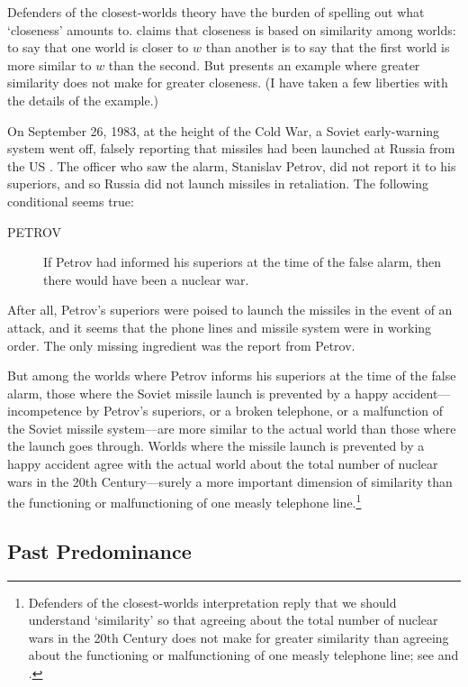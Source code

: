 Defenders of the closest-worlds theory have the burden of spelling out what `closeness' amounts to. \citet{lewis-counterfactuals} claims that closeness is based on similarity among worlds: to say that one world is closer to $w$ than another is to say that the first world is more similar to $w$ than the second.  But \citet{Fine1975-FINCN-2} presents an example where greater similarity does not make for greater closeness.  (I have taken a few liberties with the details of the example.)

On September 26, 1983, at the height of the Cold War, a Soviet early-warning system went off, falsely reporting that missiles had been launched at Russia from the US \citep{petrov}.  The officer who saw the alarm, Stanislav Petrov, did not report it to his superiors, and so Russia did not launch missiles in retaliation. The following conditional seems true:
\begin{description}
\item[PETROV] If Petrov had informed his superiors at the time of the false alarm, then there would have been a nuclear war.
\end{description}
%
After all, Petrov's superiors were poised to launch the missiles in the event of an attack, and it seems that the phone lines and missile system were in working order.  The only missing ingredient was the report from Petrov.

But among the worlds where Petrov informs his superiors at the time of the false alarm, those where the Soviet missile launch is prevented by a happy accident---incompetence by Petrov's superiors, or a broken telephone, or a malfunction of the Soviet missile system---are more similar to the actual world than those where the launch goes through.  Worlds where the missile launch is prevented by a happy accident agree with the actual world about the total number of nuclear wars in the 20th Century---surely a more important dimension of similarity than the functioning or malfunctioning of one measly telephone line.\footnote{Defenders of the closest-worlds interpretation reply that we should understand `similarity' so that agreeing about the total number of nuclear wars in the 20th Century does not make for greater similarity than agreeing about the functioning or malfunctioning of one measly telephone line; see \citet{Lewis1979-LEWCDA} and \citet{Arregui2009-ARROSI}.}

\subsection{Past Predominance}

